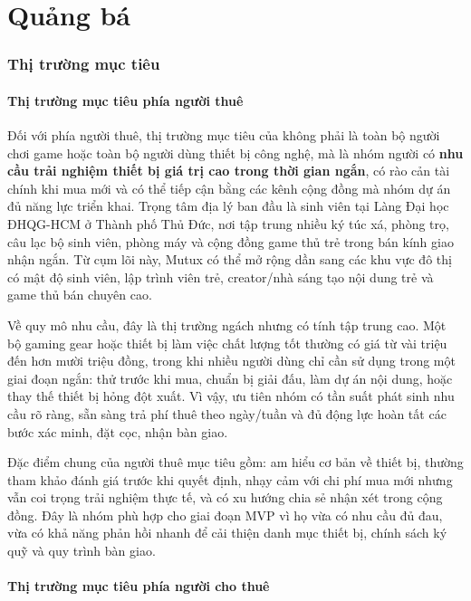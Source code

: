 
\part{Quảng bá}
\section{Thị trường mục tiêu}

\subsection{Thị trường mục tiêu phía người thuê}

Đối với phía người thuê, thị trường mục tiêu của \projectname{} không phải là toàn bộ người chơi game hoặc toàn bộ người dùng thiết bị công nghệ, mà là nhóm người có \textbf{nhu cầu trải nghiệm thiết bị giá trị cao trong thời gian ngắn}, có rào cản tài chính khi mua mới và có thể tiếp cận bằng các kênh cộng đồng mà nhóm dự án đủ năng lực triển khai. Trọng tâm địa lý ban đầu là sinh viên tại Làng Đại học ĐHQG-HCM ở Thành phố Thủ Đức, nơi tập trung nhiều ký túc xá, phòng trọ, câu lạc bộ sinh viên, phòng máy và cộng đồng game thủ trẻ trong bán kính giao nhận ngắn. Từ cụm lõi này, Mutux có thể mở rộng dần sang các khu vực đô thị có mật độ sinh viên, lập trình viên trẻ, creator/nhà sáng tạo nội dung trẻ và game thủ bán chuyên cao.

Về quy mô nhu cầu, đây là thị trường ngách nhưng có tính tập trung cao. Một bộ gaming gear hoặc thiết bị làm việc chất lượng tốt thường có giá từ vài triệu đến hơn mười triệu đồng, trong khi nhiều người dùng chỉ cần sử dụng trong một giai đoạn ngắn: thử trước khi mua, chuẩn bị giải đấu, làm dự án nội dung, hoặc thay thế thiết bị hỏng đột xuất. Vì vậy, \projectname{} ưu tiên nhóm có tần suất phát sinh nhu cầu rõ ràng, sẵn sàng trả phí thuê theo ngày/tuần và đủ động lực hoàn tất các bước xác minh, đặt cọc, nhận bàn giao.

Đặc điểm chung của người thuê mục tiêu gồm: am hiểu cơ bản về thiết bị, thường tham khảo đánh giá trước khi quyết định, nhạy cảm với chi phí mua mới nhưng vẫn coi trọng trải nghiệm thực tế, và có xu hướng chia sẻ nhận xét trong cộng đồng. Đây là nhóm phù hợp cho giai đoạn MVP vì họ vừa có nhu cầu đủ đau, vừa có khả năng phản hồi nhanh để \projectname{} cải thiện danh mục thiết bị, chính sách ký quỹ và quy trình bàn giao.

\subsection{Thị trường mục tiêu phía người cho thuê}

